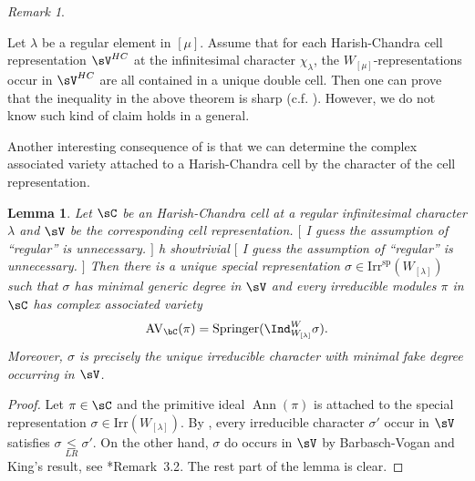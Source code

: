 \documentclass[12pt,a4paper]{amsart}
\newcommand{\trivial}[2][]{\if\relax\detokenize{#1}\relax
  {%
      \color{orange} \vspace{0em} $[$  #2 $]$
      \color{black}
  }
  \else
\ifx#1h
\ifcsname showtrivial\endcsname
{%
    \color{orange} \vspace{0em}  $[$ #2 $]$
    \color{black}
}
\fi
\else {\red Wrong argument!} \fi
\fi
}
\newcommand{\AVC}{\mathrm{AV}_\bC}
\DeclareMathOperator{\Ann}{Ann}
\newcommand{\sgn}{\operatorname{sgn}}
\numberwithin{equation}{section}
\newtheorem{lem}[thm]{Lemma}
\theoremstyle{remark}
\newtheorem{remark}[thm]{Remark}
\def\Irr{\mathrm{Irr}}
\def\Irrsp{\mathrm{Irr}^{\text{sp}}}
\def\Spr{\mathrm{Springer}}
\def\leqLR{\mathrel{\mathop{\leq}\limits_{\scriptscriptstyle LR}}}
\def\approxLR{\mathrel{\mathop{\approx}\limits_{\scriptscriptstyle LR}}}
\begin{document}



\begin{remark}\label{r46}

  Let $\lambda$ be a regular element in $[\mu]$. Assume that for each
  Harish-Chandra cell representation $\sV^{HC}$ at the infinitesimal character
  $\chi_{\lambda}$, the $W_{[\mu]}$-representations occur in $\sV^{HC}$ are all
  contained in a unique double cell. Then one can prove that the inequality in
  the above theorem is sharp (c.f. \cite{BV.W}). However, we do not know such
  kind of claim holds in a general.
\end{remark}


Another interesting consequence of  is that we can determine
the complex associated variety attached to a Harish-Chandra cell by the
character of the cell representation.

\begin{lem}\label{lem:AV.HC}
  Let $\sC$ be an Harish-Chandra cell at a regular infinitesimal character
  $\lambda$ and $\sV$ be the corresponding cell representation. \trivial[]{ I
    guess the assumption of ``regular'' is unnecessary. } Then there is a unique
  special representation $\sigma\in \Irrsp(W_{[\lambda]})$ such that $\sigma$
  has minimal generic degree in $\sV$ and every irreducible modules $\pi$ in
  $\sC$ has complex associated variety
  \[
    \AVC(\pi) = \Spr(\Ind_{W_{[\lambda]}}^{W}\sigma).
  \]
  Moreover, $\sigma$ is precisely the unique irreducible character
  with minimal fake degree occurring in $\sV$.
\end{lem}
\begin{proof}
  Let $\pi\in \sC$ and the primitive ideal $\Ann(\pi)$ is attached to the
  special representation $\sigma \in \Irr(W_{[\lambda]})$.
  By , every irreducible character $\sigma'$ occur in
  $\sV$ satisfies $\sigma \leqLR \sigma'$.
  On the other hand, $\sigma$ do occurs in $\sV$ by Barbasch-Vogan and King's
  result, see \cite{Cas}*{Remark~3.2}.
  The rest part of the lemma is clear.
\end{proof}
\end{document}
